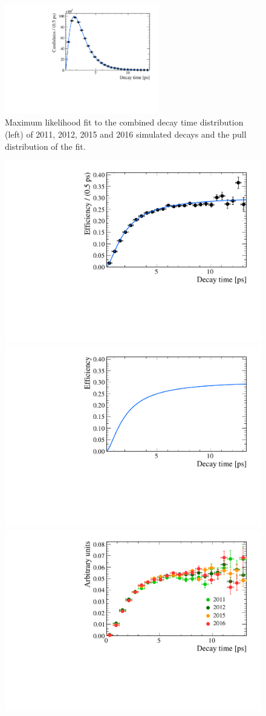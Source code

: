 {\begin{figure}[tbp]
    \centering
        \includegraphics[width= 0.6\textwidth]{./Figs/LifetimeMeasurement/Bs2MuMu_Acceptance_fit.pdf}
    \caption{Maximum likelihood fit to the combined decay time distribution (left) of 2011, 2012, 2015 and 2016 simulated \bsmumu decays and the pull distribution of the fit. }
    \label{fig:accptfit}
\end{figure}


\begin{figure}[tbp]
    \centering
        \includegraphics[width= 0.6 \textwidth]{./Figs/LifetimeMeasurement/Bs2MuMu_Acceptance_plot.pdf}
        \includegraphics[width= 0.6 \textwidth]{./Figs/LifetimeMeasurement/Bs2MuMu_Acceptance_plot_no_points.pdf}
        \includegraphics[width= 0.6 \textwidth]{./Figs/LifetimeMeasurement/Acceptance_per_year.pdf}


\end{figure}}
